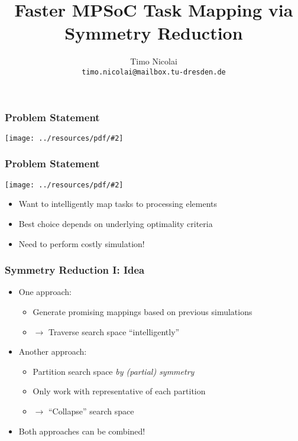 \documentclass{beamer}
\newcommand{\includeressource}[2][]{\texttt{[image: ../resources/pdf/\#2]}}
\begin{document}
\title{Faster MPSoC Task Mapping via\\Symmetry Reduction}
\author{Timo Nicolai\\\texttt{timo.nicolai@mailbox.tu-dresden.de}}

\begin{frame}
\titlepage
\end{frame}

\begin{frame}
  \frametitle{Problem Statement}

  \begin{center}
    \includeressource[width=.5\linewidth]{regular_mesh_m_n.pdf}
  \end{center}
\end{frame}

\begin{frame}
  \frametitle{Problem Statement}

  \begin{center}
    \includeressource[width=.3\linewidth]{regular_mesh_m_n.pdf}
  \end{center}

  \begin{itemize}
    \item<1-> Want to intelligently map tasks to processing elements
    \item<2-> Best choice depends on underlying optimality criteria
    \item<3-> Need to perform costly simulation!
  \end{itemize}
\end{frame}

\begin{frame}
  \frametitle{Symmetry Reduction I: Idea}

  \begin{itemize}
    \setlength\itemsep{.25cm}
    \item<1-> One approach:
      \begin{itemize}
        \item<1-> Generate promising mappings based on previous simulations
        \item<2-> $\rightarrow$ Traverse search space ``intelligently''
      \end{itemize}
    \item<3-> Another approach:
      \begin{itemize}
        \item<3-> Partition search space \textit{by (partial) symmetry}
        \item<4-> Only work with representative of each partition
        \item<5-> $\rightarrow$ ``Collapse'' search space
       \end{itemize}
    \item<6-> Both approaches can be combined!
  \end{itemize}
\end{frame}
\end{document}
